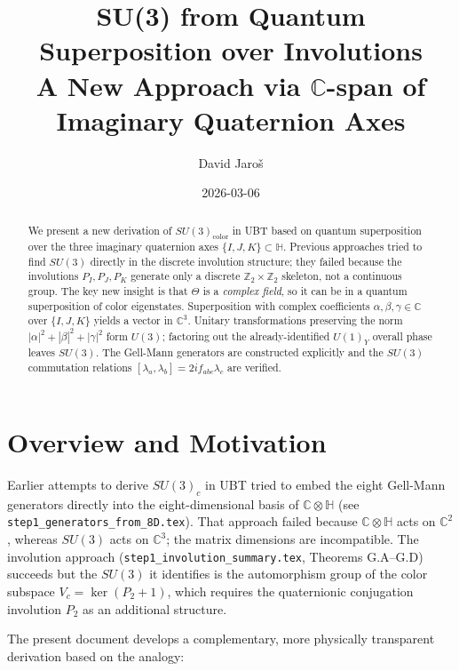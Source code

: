 \documentclass[12pt,a4paper]{article}
\title{\textbf{SU(3) from Quantum Superposition over Involutions}\\
         \large A New Approach via $\mathbb{C}$-span of Imaginary Quaternion Axes}
\author{David Jaro\v{s}}
\date{2026-03-06}
\theoremstyle{definition}
\theoremstyle{remark}
\begin{document}
  \maketitle

  \begin{abstract}
  We present a new derivation of $SU(3)_{\mathrm{color}}$ in UBT based on
  quantum superposition over the three imaginary quaternion axes $\{I, J, K\}
  \subset \mathbb{H}$.  Previous approaches tried to find $SU(3)$ directly
  in the discrete involution structure; they failed because the involutions
  $P_I, P_J, P_K$ generate only a discrete $\mathbb{Z}_2 \times \mathbb{Z}_2$
  skeleton, not a continuous group.  The key new insight is that $\Theta$ is a
  \emph{complex field}, so it can be in a quantum superposition of color
  eigenstates.  Superposition with complex coefficients $\alpha, \beta, \gamma
  \in \mathbb{C}$ over $\{I, J, K\}$ yields a vector in $\mathbb{C}^3$.
  Unitary transformations preserving the norm $|\alpha|^2 + |\beta|^2 +
  |\gamma|^2$ form $U(3)$; factoring out the already-identified $U(1)_Y$
  overall phase leaves $SU(3)$.  The Gell-Mann generators are constructed
  explicitly and the $SU(3)$ commutation relations
  $[\lambda_a, \lambda_b] = 2i f_{abc} \lambda_c$ are verified.
  \end{abstract}
\fi

\section{Overview and Motivation}
\label{sec:overview}

Earlier attempts to derive $SU(3)_c$ in UBT tried to embed the eight
Gell-Mann generators directly into the eight-dimensional basis of
$\mathbb{C}\otimes\mathbb{H}$ (see
\texttt{step1\_generators\_from\_8D.tex}).  That approach failed because
$\mathbb{C}\otimes\mathbb{H}$ acts on $\mathbb{C}^2$, whereas $SU(3)$ acts
on $\mathbb{C}^3$; the matrix dimensions are incompatible.  The involution
approach (\texttt{step1\_involution\_summary.tex}, Theorems G.A--G.D) succeeds
but the $SU(3)$ it identifies is the automorphism group of the color subspace
$V_c = \ker(P_2 + 1)$, which requires the quaternionic conjugation involution
$P_2$ as an additional structure.

The present document develops a complementary, more physically transparent
derivation based on the analogy:
\end{document}
